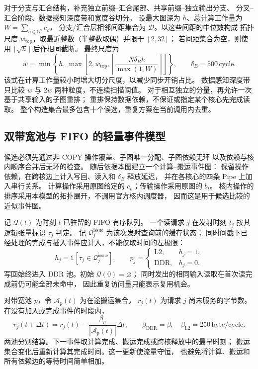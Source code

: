对于分支与汇合结构，补充独立前缀--汇合尾部、共享前缀--独立输出分支、
分叉--汇合阶段、数据感知深度带和宽度谷切分。
设最大图深为 $h$、总计算工作量为 $W=\sum_{o\in O^{\mathrm c}}c_o$，
分支/汇合层相邻间距集合为 $\mathcal D$。以这些间距的中位数构成
拓扑尺度 $w_{\mathrm{top}}$，取最近整数（半整数取偶）并限于 $[2,32]$；
若间距集合为空，则使用 $\lceil\sqrt h\rceil$ 后作相同截断。
最终尺度为
\begin{equation}
w=\min\left\{h,\,
\max\left[2,w_{\mathrm{top}},
\left\lceil\frac{N\delta_B h}{\max(1,W)}\right\rceil\right]\right\},
\qquad\delta_B=500\,\mathrm{cycle}.
\label{eq:q3-width}
\end{equation}
该式在计算工作量较小时增大切分尺度，以减少同步开销占比。
数据感知深度带只比较 $w$ 与 $2w$ 两种粒度，不连续扫描阈值。
对于相互独立的分量，再允许一次基于共享输入的子图重排；
重排保持数据依赖，不保证或指定某个核心先完成读取。
整个构造集合最多包含十个候选，重复方案在当前调用内去重。

\subsection{双带宽池与 FIFO 的轻量事件模型}
候选必须先通过非 COPY 操作覆盖、子图唯一分配、子图依赖无环
以及依赖与核内顺序合并后无环的检查。
随后依据本图建立一个计算--搬运事件图：
保留操作依赖，在跨核边上计入写回、读入和 $\delta_B$ 释放延迟，
并在各核心的四条 Pipe 上加入串行关系。
计算操作采用原图给定的 $c_o$；传输操作采用原图的 $b_t$。
核内操作的排序采用本模型的拓扑展开，不调用官方核内调度器，
因而这是用于候选比较的近似事件图。

记 $\mathcal Q(t)$ 为时刻 $t$ 已驻留的 FIFO 有序队列。
一个读请求 $j$ 在发射时刻 $t_j$ 按其逻辑张量标识 $\tau_j$ 判定。
记 $\mathcal Q_j^{\mathrm{issue}}$ 为该次发射查询前的缓存状态；
同时间戳下已经处理的完成与插入事件应计入，不能仅取时间的左极限：
\begin{equation}
h_j=\mathbb 1[\tau_j\in\mathcal Q_j^{\mathrm{issue}}],\qquad
p_j=
\begin{cases}
\mathrm{L2},&h_j=1,\\
\mathrm{DDR},&h_j=0.
\end{cases}
\label{eq:q3-hit}
\end{equation}
写回始终进入 DDR 池。初始 $\mathcal Q(0)=\varnothing$；
同时发出的相同输入读取在首次读完成前仍可能全部未命中，
因此重复访问量只能表示复用机会。

对带宽池 $p$，令 $\mathcal A_p(t)$ 为在途搬运集合，
$r_j(t)$ 为请求 $j$ 尚未服务的字节数。在没有加入或完成事件的时段内，
\begin{equation}
r_j(t+\Delta t)=r_j(t)-
\frac{\beta_p}{|\mathcal A_p(t)|}\Delta t,\qquad
\beta_{\mathrm{DDR}}=\beta,\quad
\beta_{\mathrm{L2}}=250\,\mathrm{byte/cycle}.
\label{eq:q3-bandwidth}
\end{equation}
两池分别结算。下一事件取计算完成、搬运完成或跨核释放中的最早时刻；
搬运集合变化后重新计算其完成时间。这一更新使流量守恒，
也避免将计算、搬运和所有依赖边的等待时间简单相加。

